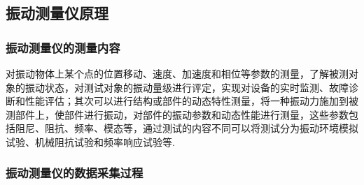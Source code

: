 \documentclass[12pt,a4paper,citestyle=gb7714-2015, bibstyle=gb7714-2015,bibtex]{HDUPaper}
\begin{document}
\subsection{振动测量仪原理}
\subsubsection{振动测量仪的测量内容}
对振动物体上某个点的位置移动、速度、加速度和相位等参数的测量，了解被测对象的振动状态，对测试对象的振动量级进行评定，实现对设备的实时监测、故障诊断和性能评估；其次可以进行结构或部件的动态特性测量，将一种振动力施加到被测部件上，使部件进行振动，对部件的振动参数和动态性能进行测量，这些参数包括阻尼、阻抗、频率、模态等，通过测试的内容不同可以将测试分为振动环境模拟试验、机械阻抗试验和频率响应试验等.
\subsubsection{振动测量仪的数据采集过程}
\end{document}
